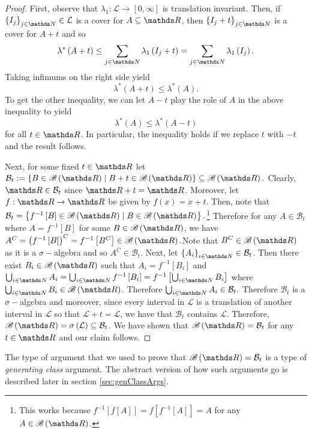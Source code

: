 \begin{proof}
First, observe that $\lambda_{1}:\mathcal{L}\to\left[0,\infty\right]$
is translation invariant. Then, if $\left\{ I_{j}\right\} _{j\in\N}\in\mathcal{L}$
is a cover for $A\subseteq\R$, then $\left\{ I_{j}+t\right\} _{j\in\N}$
is a cover for $A+t$ and so
\[
\lambda^{*}\left(A+t\right)\leq\sum_{j\in\N}\lambda_{1}\left(I_{j}+t\right)=\sum_{j\in\N}\lambda_{1}\left(I_{j}\right).
\]
Taking infimums on the right side yield
\[
\lambda^{*}\left(A+t\right)\leq\lambda^{*}\left(A\right).
\]
To get the other inequality, we can let $A-t$ play the role of $A$
in the above inequality to yield
\[
\lambda^{*}\left(A\right)\leq\lambda^{*}\left(A-t\right)
\]
for all $t\in\R$. In particular, the inequality holds if we replace
$t$ with $-t$ and the result follows.

Next, for some fixed $t\in\R$ let $\mathcal{B}_{t}:=\left\{ B\in\borel\left(\R\right)\mid B+t\in\borel\left(\R\right)\right\} \subseteq\borel\left(\R\right).$
Clearly, $\R\in\mathcal{B}_{t}$ since $\R+t=\R$. Moreover, let $f:\R\to\R$
be given by $f\left(x\right)=x+t$. Then, note that $\mathcal{B}_{t}=\left\{ f^{-1}\left[B\right]\in\borel\left(\R\right)\mid B\in\borel\left(\R\right)\right\} .$\footnote{This works because $f^{-1}\left[f\left[A\right]\right]=f\left[f^{-1}\left[A\right]\right]=A$
for any $A\in\borel\left(\R\right)$.} Therefore for any $A\in\mathcal{B}_{t}$ where $A=f^{-1}\left[B\right]$
for some $B\in\borel\left(\R\right)$, we have $A^{C}=\left(f^{-1}\left[B\right]\right)^{C}=f^{-1}\left[B^{C}\right]\in\borel\left(\R\right).$Note
that $B^{C}\in\borel\left(\R\right)$ as it is a $\sigma-$algebra
and so $A^{C}\in\mathcal{B}_{t}.$ Next, let $\left\{ A_{i}\right\} _{i\in\N}\in\mathcal{B}_{t}$.
Then there exist $B_{i}\in\borel\left(\R\right)$ such that $A_{i}=f^{-1}\left[B_{i}\right]$
and $\bigcup_{i\in\N}A_{i}=\bigcup_{i\in\N}f^{-1}\left[B_{i}\right]=f^{-1}\left[\bigcup_{i\in\N}B_{i}\right]$
where $\bigcup_{i\in\N}B_{i}\in\borel\left(\R\right)$. Therefore
$\bigcup_{i\in\N}A_{i}\in\mathcal{B}_{t}.$ Therefore $\mathcal{B}_{t}$
is a $\sigma-$algebra and moreover, since every interval in $\mathcal{L}$
is a translation of another interval in $\mathcal{L}$ so that $\mathcal{L}+t=\mathcal{L}$,
we have that $\mathcal{B}_{t}$ contains $\mathcal{L}$. Therefore,
$\borel\left(\R\right)=\sigma\left(\mathcal{L}\right)\subseteq\mathcal{B}_{t}$.
We have shown that $\borel\left(\R\right)=\mathcal{B}_{t}$ for any
$t\in\R$ and our claim follows.
\end{proof}
\begin{rem*}
The type of argument that we used to prove that $\borel\left(\R\right)=\mathcal{B}_{t}$
is a type of \emph{generating class }argument. The abstract version
of how such arguments go is described later in section \ref{sec:genClassArgs}.
\end{rem*}
